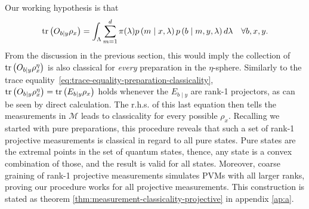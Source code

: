         Our working hypothesis is that
        $$
            \text{tr}\left(  O_{b \mid y} \rho_x \right) = \int_{\Lambda} \sum_{m = 1}^{d} \pi(\lambda) p \left( m \mid x,\lambda \right) p \left( b \mid m,y,\lambda \right) d\lambda \quad\forall b,x,y .
        $$
        From the discussion in the previous section, this would imply the collection of $\text{tr}\left(  O_{b \mid y} \rho_x^\eta \right)$ is also classical for \emph{every} preparation in the $\eta$-sphere. Similarly to the trace equality~\eqref{eq:trace-equality-preparation-classicality}, $\text{tr}\left(  O_{b \mid y} \rho_x^\eta \right) = \text{tr}\left( E_{b \mid y} \rho_x \right)$ holds whenever the $E_{b \mid y}$ are rank-1 projectors, as can be seen by direct calculation. The r.h.s. of this last equation then tells the measurements in $\mathcal{M}$ leads to classicality for every possible $\rho_x$. Recalling we started with pure preparations, this procedure reveals that such a set of rank-1 projective measurements is classical in regard to all pure states. Pure states are the extremal points in the set of quantum states, thence, any state is a convex combination of those, and the result is valid for all states. Moreover, coarse graining of rank-1 projective measurements simulates PVMs with all larger ranks, proving our procedure works for all projective measurements. This construction is stated as theorem \ref{thm:measurement-classicality-projective} in appendix \ref{ap:a}.

